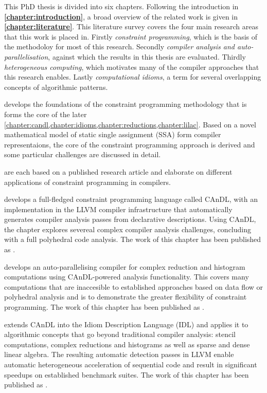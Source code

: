     This PhD thesis is divided into six chapters.
    Following the introduction in {\bf\cref{chapter:introduction}}, a broad
    overview of the related work is given in {\bf\cref{chapter:literature}}.
    This literature survey covers the four main research areas that this work
    is placed in.
    Firstly {\em constraint programming}, which is the basis of the methodoloy
    for most of this research.
    Secondly {\em compiler analysis and auto-parallelisation}, against which the
    results in this thesis are evaluated.
    Thirdly {\em heterogeneous computing}, which motivates many of the compiler
    approaches that this research enables.
    Lastly {\em computational idioms}, a term for several overlapping concepts
    of algorithmic patterns.

    {\bf{}} develops the foundations of the constraint
    programming methodology that is forms the core of the later
    \cref{chapter:candl,chapter:idioms,chapter:reductions,chapter:lilac}.
    Based on a novel mathematical model of static single assignment (SSA) form
    compiler representaions, the core of the constraint programming approach
    is derived and some particular challenges are discussed in detail.

    {\bf{}}
    are each based on a published research article and elaborate on different
    applications of constraint programming in compilers.

    {\bf{}} develops a full-fledged constraint programming
    language called CAnDL, with an implementation in the LLVM compiler
    infrastructure that automatically generates compiler analysis passes from
    declarative descriptions.
    Using CAnDL, the chapter explores severeal complex compiler analysis
    challenges, concluding with a full polyhedral code analysis.
    The work of this chapter has been published as
    {\bf\citet{Ginsbach:2018:CDS:3178372.3179515}}.

    {\bf{}} develops an auto-parallelising compiler for
    complex reduction and histogram computations using CAnDL-powered analysis
    functionality.
    This covers many computations that are inaccesible to established approaches
    based on data flow or polyhedral analysis and is to demonstrate the greater
    flexibility of constraint programming.
    The work of this chapter has been published as
    {\bf\citet{ginsbach2017discovery}}.

    {\bf{}} extends CAnDL into the Idiom Description Language
    (IDL) and applies it to algorithmic concepts that go beyond traditional
    compiler analysis: stencil computations, complex reductions and histograms
    as well as sparse and dense linear algebra.
    The resulting automatic detection passes in LLVM enable automatic
    heterogeneous acceleration of sequential code and result in significant
    speedups on established benchmark suites.
    The work of this chapter has been published as
    {\bf\citet{Ginsbach:2018:AML:3173162.3173182}}.

